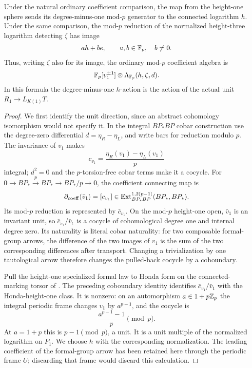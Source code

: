 \begin{lemma}\label{h3:des:unit-directions}
Under the natural ordinary coefficient comparison, the map
from the height-one sphere sends its degree-minus-one
mod-\(p\) generator to the connected logarithm \(h\).
Under the same comparison, the mod-\(p\) reduction of the normalized
height-three logarithm detecting \(\zeta\) has image
\[
 a h+b e,\qquad a,b\in\mathbb F_p,\quad b\ne0.
\]
Thus, writing \(\zeta\) also for its image, the ordinary
mod-\(p\) coefficient algebra is
\[
 \mathbb F_p[v_1^{\pm1}]\otimes\Lambda_{\mathbb F_p}(h,\zeta,d).
\]
In this formula the degree-minus-one \(h\)-action is the
action of the actual unit \(R_1\to L_{K(1)}T\).
\end{lemma}

\begin{proof}
We first identify the unit direction, since an abstract
cohomology isomorphism would not specify it.  In the integral \(BP_*BP\) cobar construction use the
degree-zero differential \(d=\eta_R-\eta_L\), and write bars for
reduction modulo \(p\).  The invariance of \(\bar v_1\) makes
\[
 c_{v_1}=\frac{\eta_R(v_1)-\eta_L(v_1)}p
\]
integral; \(d^2=0\) and the \(p\)-torsion-free cobar terms make it a
cocycle.  For \(0\to BP_*\xrightarrow p BP_*\to BP_*/p\to0\),
the coefficient connecting map is
\[
 \partial_{\mathrm{coeff}}(\bar v_1)=[c_{v_1}]
 \in\operatorname{Ext}^{1,2(p-1)}_{BP_*BP}(BP_*,BP_*).
\]
Its mod-\(p\) reduction is represented by \(\bar c_{v_1}\).
On the mod-\(p\) height-one open, \(\bar v_1\) is an invariant
unit, so \(\bar c_{v_1}/\bar v_1\) is a cocycle of cohomological
degree one and internal degree zero.  Its naturality is
literal cobar naturality: for two composable formal-group
arrows, the difference of the two images of \(v_1\) is the
sum of the two corresponding differences after transport.
Changing a trivialization by one tautological arrow
therefore changes the pulled-back cocycle by a coboundary.

Pull the height-one specialized formal law to Honda form
on the connected-marking torsor of
.  The preceding coboundary
identity identifies \(\bar c_{v_1}/\bar v_1\) with the Honda-height-one
class.  It is nonzero: on an automorphism \(a\in1+p\mathbb Z_p\)
the integral periodic frame changes \(v_1\) by
\(a^{p-1}\), and the cocycle is
\[
 \frac{a^{p-1}-1}{p}\pmod p.
\]
At \(a=1+p\) this is \(p-1\pmod p\), a unit.
It is a unit multiple of the normalized logarithm on \(P_1\).
We choose \(h\) with the corresponding normalization.
The leading coefficient of the formal-group arrow has
been retained here through the periodic frame \(U\);
discarding that frame would discard this calculation.


\end{proof}
